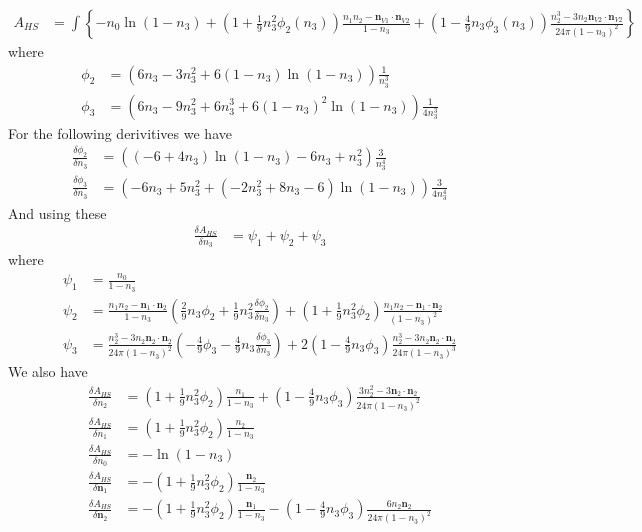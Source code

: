 \documentclass[letterpaper,twocolumn,amsmath,amssymb,jcp,10pt,aip]{revtex4-1}
\begin{document}
\begin{widetext}
\begin{align} 
A_{HS} &= \int \left\{
    -n_0 \ln\left(1 - n_3\right)
    + \left(1 + \frac{1}{9}n_3^2 \phi_2(n_3)\right)   \frac{n_1 n_2 - \mathbf{n}_{V1} \cdot\mathbf{n}_{V2}}{1-n_3}
    + \left(1 - \frac{4}{9}n_3\phi_3(n_3)\right)\frac{n_2^3 - 3 n_2 \mathbf{n}_{V2} \cdot \mathbf{n}_{V2}}{24\pi (1-n_3)^2}
    \right\}
\end{align}
 where
 \begin{align}
   \phi_2 &= \left(6n_3 - 3n_3^2 + 6(1-n_3)\ln(1-n_3)\right)\frac{1}{n_3^3}\\
   \phi_3 &= \left(6n_3 - 9n_3^2 + 6n_3^3 + 6(1-n_3)^2 \ln(1-n_3)\right)\frac{1}{4n_3^3}
 \end{align}
For the following derivitives we have
\begin{align}
   \frac{\delta \phi_2}{\delta n_3} &= \left((-6+4n_3)\ln(1-n_3) - 6n_3 + n_3^2\right)\frac{3}{n_3^4}\\
   \frac{\delta \phi_3}{\delta n_3} &= \left(-6n_3 + 5n_3^2 + (-2n_3^2 + 8n_3 -6)\ln(1-n_3)\right)\frac{3}{4n_3^4}
 \end{align}
And using these
\begin{align}
  \frac{\delta A_{HS}}{\delta n_3} &= \psi _1 + \psi _2 + \psi _3
\end{align}
where
\begin{align}
  \psi_1 &= \frac{n_0}{1-n_3}\\
  \psi_2 &= \frac{n_1n_2 - \mathbf{n}_1\cdot \mathbf{n}_2}{1-n_3}\left(\frac{2}{9}n_3\phi_2 + \frac{1}{9}n_3^2\frac{\delta \phi_2}{\delta n_3}\right) + \left(1 + \frac{1}{9}n_3^2\phi_2\right)\frac{n_1n_2 - \mathbf{n}_1\cdot \mathbf{n}_2}{(1-n_3)^2}\\
  \psi_3 &= \frac{n_2^3 - 3n_2\mathbf{n}_2 \cdot \mathbf{n}_2}{24\pi(1-n_3)^2}\left(-\frac{4}{9}\phi_3 - \frac{4}{9}n_3\frac{\delta \phi_3}{\delta n_3}\right) + 2\left(1 - \frac{4}{9}n_3\phi_3\right)\frac{n_2^3 - 3n_2\mathbf{n}_2 \cdot \mathbf{n}_2}{24\pi(1-n_3)^3} 
\end{align}
We also have
\begin{align}
  \frac{\delta A_{HS}}{\delta n_2} &= (1 + \frac{1}{9}n_3^2\phi_2)\frac{n_1}{1-n_3} + (1 - \frac{4}{9}n_3\phi_3)\frac{3n_2^2 - 3\mathbf{n}_2 \cdot \mathbf{n}_2}{24\pi(1 - n_3)^2}\\
  \frac{\delta A_{HS}}{\delta n_1} &= (1 + \frac{1}{9}n_3^2\phi_2)\frac{n_2}{1 - n_3}\\
  \frac{\delta A_{HS}}{\delta n_0} &= -\ln(1 - n_3)\\
  \frac{\delta A_{HS}}{\delta \mathbf{n}_1} &= -(1 + \frac{1}{9}n_3^2 \phi_2)\frac{\mathbf{n}_2}{1 - n_3}\\
  \frac{\delta A_{HS}}{\delta \mathbf{n}_2} &= -(1 + \frac{1}{9}n_3^2\phi_2)\frac{\mathbf{n}_1}{1 - n_3} 
  - (1 - \frac{4}{9}n_3\phi_3)\frac{6n_2\mathbf{n}_2}{24\pi(1 - n_3)^2}
\end{align}



\end{widetext}
\end{document}
